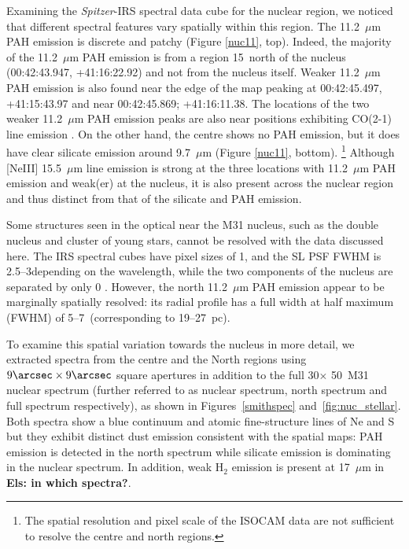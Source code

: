 Examining the {\em Spitzer}-IRS spectral data cube for the nuclear region, we noticed that different spectral features vary spatially within this region.
The 11.2~$\mu$m PAH emission is discrete and patchy (Figure \ref{nuc11}, top).  
Indeed, the majority of the 11.2~$\mu$m  PAH emission is from a region 15\arcsec\ north of the nucleus (00:42:43.947, +41:16:22.92) and not from 
the nucleus itself. Weaker 11.2~$\mu$m PAH emission is also found near the edge of the map peaking at 00:42:45.497, +41:15:43.97 and near 00:42:45.869; +41:16:11.38.
The locations of the two weaker 11.2~$\mu$m PAH emission peaks are also near positions exhibiting CO(2-1) line emission \citep[\#36 and 28 of][the strongest 11.2~$\mu$m PAH emission peak is outside the CO FOV]{Melchior2013}. 
On the other hand, the centre shows no PAH emission, but it does have clear silicate emission around 9.7~$\mu$m (Figure \ref{nuc11}, bottom).%
\footnote{The spatial resolution and pixel scale of the ISOCAM data are not sufficient to resolve the centre  and north regions.}
Although [NeIII] 15.5~$\mu$m line emission is strong at the three locations with 11.2~$\mu$m PAH emission and weak(er) at the nucleus, 
it is also present across the nuclear region and thus distinct from that of the silicate and PAH emission. 

Some structures seen in the optical near the M31 nucleus, such as the double nucleus and cluster of young stars, cannot be resolved with the data discussed here. The IRS spectral cubes have pixel sizes of 1, and the SL PSF FWHM is 2.5--3\arcsec depending on the wavelength, while the two components of the nucleus are separated by only 0 \citep{Bender2005}. However, the north 11.2~$\mu$m  PAH emission appear to be marginally spatially resolved: its radial profile has a full width at half maximum (FWHM) of 5--7\arcsec\ (corresponding to 19--27~pc).

To examine this spatial variation towards the nucleus in more detail, we extracted spectra from the centre and the North regions using  $9\arcsec \times 9\arcsec$ square apertures in addition to the full 30\arcsec $\times$ 50\arcsec\ M31 nuclear spectrum (further referred to as nuclear spectrum, north spectrum and full spectrum respectively), as shown in Figures~\ref{smithspec} and~\ref{fig:nuc_stellar}. Both spectra show a blue continuum and atomic fine-structure lines of Ne and S but they exhibit distinct dust emission consistent with the spatial maps: PAH emission is detected in the north spectrum while silicate emission is dominating in the nuclear spectrum.  In addition, weak H$_2$ emission is present at 17~$\mu$m in {\bf Els: in which spectra?}.

